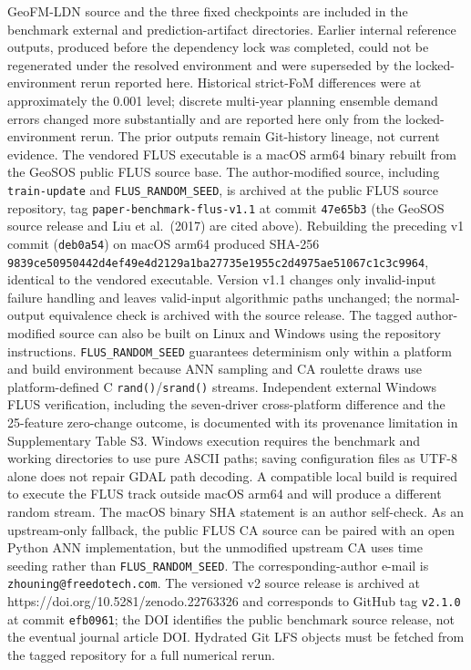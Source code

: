GeoFM-LDN source and the three fixed checkpoints are included in the
benchmark external and prediction-artifact directories. Earlier internal
reference outputs, produced before the dependency lock was completed,
could not be regenerated under the resolved environment and were
superseded by the locked-environment rerun reported here. Historical
strict-FoM differences were at approximately the 0.001 level; discrete
multi-year planning ensemble demand errors changed more substantially
and are reported here only from the locked-environment rerun. The prior
outputs remain Git-history lineage, not current evidence. The vendored
FLUS executable is a macOS arm64 binary rebuilt from the GeoSOS public
FLUS source base. The author-modified source, including
\texttt{train-update} and \texttt{FLUS\_RANDOM\_SEED}, is archived at
the public FLUS source repository, tag
\texttt{paper-benchmark-flus-v1.1} at commit \texttt{47e65b3} (the
GeoSOS source release and Liu et al.~(2017) are cited above). Rebuilding
the preceding v1 commit (\texttt{deb0a54}) on macOS arm64 produced
SHA-256
\texttt{9839ce50950442d4ef49e4d2129a1ba27735e1955c2d4975ae51067c1c3c9964},
identical to the vendored executable. Version v1.1 changes only
invalid-input failure handling and leaves valid-input algorithmic paths
unchanged; the normal-output equivalence check is archived with the
source release. The tagged author-modified source can also be built on
Linux and Windows using the repository instructions.
\texttt{FLUS\_RANDOM\_SEED} guarantees determinism only within a
platform and build environment because ANN sampling and CA roulette
draws use platform-defined C \texttt{rand()}/\texttt{srand()} streams.
Independent external Windows FLUS verification, including the
seven-driver cross-platform difference and the 25-feature zero-change
outcome, is documented with its provenance limitation in Supplementary
Table S3. Windows execution requires the benchmark and working
directories to use pure ASCII paths; saving configuration files as UTF-8
alone does not repair GDAL path decoding. A compatible local build is
required to execute the FLUS track outside macOS arm64 and will produce
a different random stream. The macOS binary SHA statement is an author
self-check. As an upstream-only fallback, the public FLUS CA source can
be paired with an open Python ANN implementation, but the unmodified
upstream CA uses time seeding rather than \texttt{FLUS\_RANDOM\_SEED}.
The corresponding-author e-mail is \texttt{zhouning@freedotech.com}. The
versioned v2 source release is archived at
https://doi.org/10.5281/zenodo.22763326 and corresponds to GitHub tag
\texttt{v2.1.0} at commit \texttt{efb0961}; the DOI identifies the
public benchmark source release, not the eventual journal article DOI.
Hydrated Git LFS objects must be fetched from the tagged repository for
a full numerical rerun.


